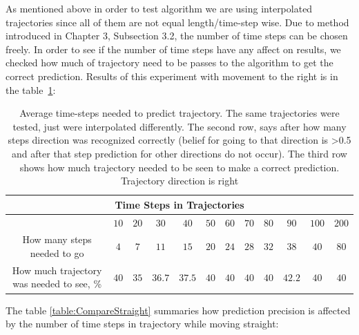 As mentioned above in order to test algorithm we are using interpolated trajectories since all of them are not equal length/time-step wise. Due to method introduced in Chapter 3, Subsection 3.2, the  number of time steps can be chosen freely. In order to see if the number of time steps have any affect on results, we checked how much of trajectory need to be passes to the algorithm to get the correct prediction. Results of this experiment with movement to the right is in the table~\ref{table:CompareRight}:

\begin{table}[H]
	\centering
	\begin{tabular}{|c|c|c|c|c|c|c|c|c|c|c|c|} 
		\hline
		\multicolumn{12}{|c|}{Time Steps in Trajectories} \\
		\hline
		& $10$ & $20$ & $30$ & $40$ & $50$ & $60$ & $70$ & $80$ & $90$ & $100$ & $200$ \\ [0.5ex] 
		\hline\hline
		How many steps needed to go               & $4$ & $7$ & $11$ & $15$ & $20$ & $24$ & $28$ & $32$ & $38$ & $40$ & $80$ \\ [1ex]
		How much trajectory was needed to see, \% & $40$ & $35$ & $36.7$ & $37.5$ & $40$ & $40$ & $40$ & $40$ & $42.2$ & $40$ & $40$ \\ [1ex]
		\hline
	\end{tabular}
	\caption{Average time-steps needed to predict trajectory. The same trajectories were tested, just were interpolated differently. The second row, says after how many steps direction was recognized correctly (belief for going to that direction is >0.5 and after that step prediction for other directions do not occur). The third row shows how much trajectory needed to be seen to make a correct prediction. Trajectory direction is right}
	\label{table:CompareRight}
\end{table}

The table \ref{table:CompareStraight} summaries how prediction precision is affected by the number of time steps in trajectory while moving straight:

